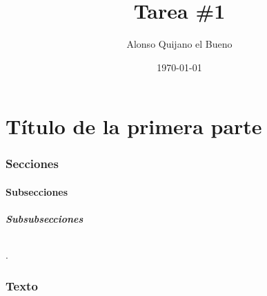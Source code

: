 \documentclass[theorems,spanish]{Marianita}
\institute{Escuela de Ciencias Físicas y Matemáticas}
\title{Tarea \#1}
\author{Alonso Quijano el Bueno}
\date{\today}
\begin{document}
\maketitle

{\color{seventh}\part{\color{first}Título de la primera parte}}
{\color{second}\section{Secciones}}
{\color{third}\subsection{Subsecciones}}
{\color{fourth}\subsubsection{Subsubsecciones}}
\paragraph{\kant[1]}.

{\color{second}\section{Texto}}
\kant[2-3]
\end{document}
